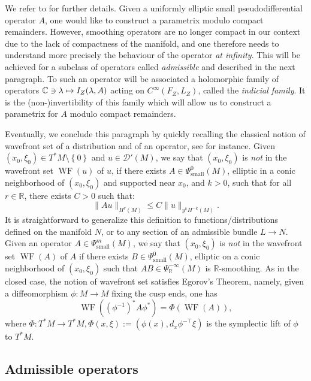 \documentclass[10pt]{amsart}
\newcommand\mto{\mathchoice{\longmapsto}{\mapsto}{\mapsto}{\mapsto}}
\newcommand{\C}{\mathbb{C}}
\newcommand{\R}{\mathbb{R}}
\newcommand{\mc}{\mathcal}
\DeclareMathOperator{\WF}{WF}
\theoremstyle{plain}
\theoremstyle{definition}
\begin{document}
We refer to \cite[\S\S 2 \& 3]{Bonthonneau-Lefeuvre-19-1} for further details. Given a uniformly elliptic small pseudodifferential operator $A$, one would like to construct a parametrix modulo compact remainders. However, smoothing operators are no longer compact in our context due to the lack of compactness of the manifold, and one therefore needs to understand more precisely the behaviour of the operator \emph{at infinity}. This will be achieved for a subclass of operators called \emph{admissible} and described in the next paragraph. To such an operator will be associated a holomorphic family of operators $\C \ni \lambda \mto I_Z(\lambda,A)$ acting on $C^\infty(F_Z,L_Z)$, called the \emph{indicial family}. It is the (non-)invertibility of this family which will allow us to construct a parametrix for $A$ modulo compact remainders.

Eventually, we conclude this paragraph by quickly recalling the classical notion of wavefront set of a distribution and of an operator, see \cite{Grigis-Sjostrand-94} for instance. Given $(x_0,\xi_0) \in T^*M \setminus \left\{0 \right\}$ and $u \in \mc{D}'(M)$, we say that $(x_0,\xi_0)$ is \emph{not} in the wavefront set $\WF(u)$ of $u$, if there exists $A \in \Psi^0_{\mathrm{small}}(M)$, elliptic in a conic neighborhood of $(x_0,\xi_0)$ and supported near $x_0$, and $k > 0$, such that for all $r \in \R$, there exists $C > 0$ such that:
\[
\|Au\|_{H^r(M)} \leq C \|u\|_{y^k H^{-k}(M)}.
\]
It is straightforward to generalize this definition to functions/distributions defined on the manifold $N$, or to any section of an admissible bundle $L \to N$. Given an operator $A \in \Psi^m_{\mathrm{small}}(M)$, we say that $(x_0,\xi_0)$ is \emph{not} in the wavefront set $\WF(A)$ of $A$ if there exists $B \in \Psi^0_{\mathrm{small}}(M)$, elliptic on a conic neighborhood of $(x_0,\xi_0)$ such that $AB \in \Psi^{-\infty}_{\R}(M)$ is $\R$-smoothing. As in the closed case, the notion of wavefront set satisfies Egorov's Theorem, namely, given a diffeomorphism $\phi : M \to M$ fixing the cusp ends, one has
\begin{equation}
\label{equation:egorov}
\WF((\phi^{-1})^*A\phi^*) = \Phi(\WF(A)),
\end{equation}
where $\Phi : T^*M \to T^*M, \Phi(x,\xi) := (\phi(x), d_x\phi^{-\top}\xi)$ is the symplectic lift of $\phi$ to $T^*M$.

\subsection{Admissible operators}
\end{document}
